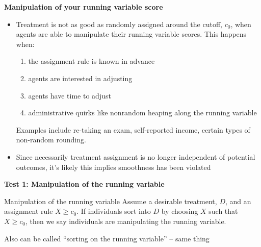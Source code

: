 \documentclass[notes=show]{beamer}
\begin{document}
\begin{frame}[plain]

	\begin{center}
	\textbf{Manipulation of your running variable score}
	\end{center}
	
	\begin{itemize}
	\item Treatment is not as good as randomly assigned around the cutoff, $c_0$, when agents are able to manipulate their running variable scores.  This happens when:
		\begin{enumerate}
		\item the assignment rule is known in advance
		\item agents are interested in adjusting
		\item agents have time to adjust
		\item administrative quirks like nonrandom heaping along the running variable
		\end{enumerate}
Examples include re-taking an exam, self-reported income, certain types of non-random rounding.
	\item Since necessarily treatment assignment is no longer independent of potential outcomes, it's likely this implies smoothness has been violated
	\end{itemize}
\end{frame}



\begin{frame}[plain]
	\begin{center}
	\textbf{Test 1: Manipulation of the running variable}
	\end{center}
	
	\begin{block}{Manipulation of the running variable}
Assume a desirable treatment, $D$, and an assignment rule $X\geq{c_0}$.  If individuals sort into $D$ by choosing $X$ such that $X\geq{c_0}$, then we say individuals are manipulating the running variable. 
	\end{block}
Also can be called ``sorting on the running variable'' -- same thing

\end{frame}
\end{document}
